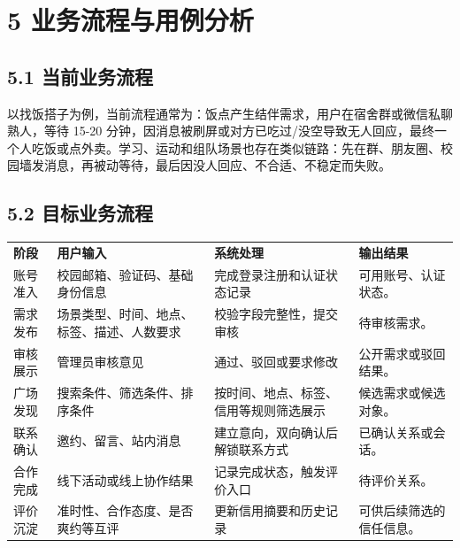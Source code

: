 \chapter{5
业务流程与用例分析}\label{ux4e1aux52a1ux6d41ux7a0bux4e0eux7528ux4f8bux5206ux6790}

\section{5.1
当前业务流程}\label{ux5f53ux524dux4e1aux52a1ux6d41ux7a0b}

以找饭搭子为例，当前流程通常为：饭点产生结伴需求，用户在宿舍群或微信私聊熟人，等待
15-20
分钟，因消息被刷屏或对方已吃过/没空导致无人回应，最终一个人吃饭或点外卖。学习、运动和组队场景也存在类似链路：先在群、朋友圈、校园墙发消息，再被动等待，最后因没人回应、不合适、不稳定而失败。

\section{5.2
目标业务流程}\label{ux76eeux6807ux4e1aux52a1ux6d41ux7a0b}

{\def\LTcaptype{none} %
\begin{xltabular}{\textwidth}{@{}>{\centering\arraybackslash}X>{\centering\arraybackslash}X>{\centering\arraybackslash}X>{\centering\arraybackslash}X@{}}
\toprule\noalign{}
\endhead
\bottomrule\noalign{}
\endlastfoot
\textbf{阶段} & \textbf{用户输入} & \textbf{系统处理} &
\textbf{输出结果} \\
账号准入 & 校园邮箱、验证码、基础身份信息 & 完成登录注册和认证状态记录 &
可用账号、认证状态。 \\
需求发布 & 场景类型、时间、地点、标签、描述、人数要求 &
校验字段完整性，提交审核 & 待审核需求。 \\
审核展示 & 管理员审核意见 & 通过、驳回或要求修改 &
公开需求或驳回结果。 \\
广场发现 & 搜索条件、筛选条件、排序条件 &
按时间、地点、标签、信用等规则筛选展示 & 候选需求或候选对象。 \\
联系确认 & 邀约、留言、站内消息 & 建立意向，双向确认后解锁联系方式 &
已确认关系或会话。 \\
合作完成 & 线下活动或线上协作结果 & 记录完成状态，触发评价入口 &
待评价关系。 \\
评价沉淀 & 准时性、合作态度、是否爽约等互评 & 更新信用摘要和历史记录 &
可供后续筛选的信任信息。 \\
\end{xltabular}
}


